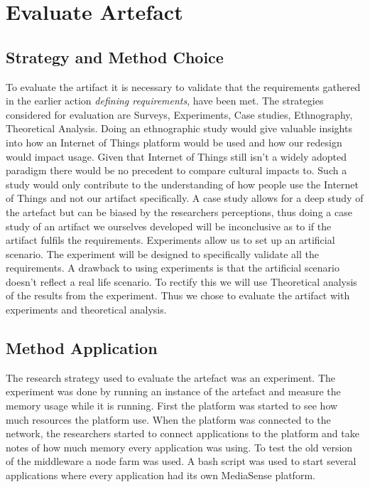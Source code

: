 \section{Evaluate Artefact}
\subsection{Strategy and Method Choice}
To evaluate the artifact it is necessary to validate that the requirements gathered in the earlier action \emph{defining requirements}, have been met. The strategies considered for evaluation are Surveys, Experiments, Case studies, Ethnography, Theoretical Analysis. 
Doing an ethnographic study would give valuable insights into how an Internet of Things platform would be used and how our redesign would impact usage. Given that Internet of Things still isn't a widely adopted paradigm there would be no precedent to compare cultural impacts to. Such a study would only contribute to the understanding of how people use the Internet of Things and not our artifact specifically. A case study allows for a deep study of the artefact but can be biased by the researchers perceptions, thus doing a case study of an artifact we ourselves developed will be inconclusive as to if the artifact fulfils the requirements.
Experiments allow us to set up an artificial scenario. The experiment will be designed to specifically validate all the requirements. A drawback to using experiments is that the artificial scenario doesn't reflect a real life scenario. To rectify this we will use Theoretical analysis of the results from the experiment. Thus we chose to evaluate the artifact with experiments and theoretical analysis.


\subsection{Method Application}
The research strategy used to evaluate the artefact was an experiment. The experiment was done by running an instance of the artefact and measure the memory usage while it is running. First the platform was started to see how much resources the platform use. When the platform was connected to the network, the researchers started to connect applications to the platform and take notes of how much memory every application was using. To test the old version of the middleware a node farm was used. A bash script was used to start several applications where every application had its own MediaSense platform. 

